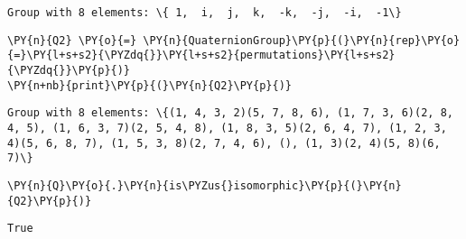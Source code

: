 \begin{itemize}
\begin{itemize}
\begin{tcolorbox}[breakable, size=fbox, boxrule=.5pt, pad at break*=1mm, opacityfill=0]
    \begin{Verbatim}[commandchars=\\\{\}]
Group with 8 elements: \{ 1,  i,  j,  k,  -k,  -j,  -i,  -1\}
    \end{Verbatim}
\end{tcolorbox}


    \begin{tcolorbox}[breakable, size=fbox, boxrule=1pt, pad at break*=1mm,colback=cellbackground, colframe=cellborder]
\begin{Verbatim}[commandchars=\\\{\}]
\PY{n}{Q2} \PY{o}{=} \PY{n}{QuaternionGroup}\PY{p}{(}\PY{n}{rep}\PY{o}{=}\PY{l+s+s2}{\PYZdq{}}\PY{l+s+s2}{permutations}\PY{l+s+s2}{\PYZdq{}}\PY{p}{)}
\PY{n+nb}{print}\PY{p}{(}\PY{n}{Q2}\PY{p}{)}
\end{Verbatim}
\end{tcolorbox}

    \begin{Verbatim}[commandchars=\\\{\}]
Group with 8 elements: \{(1, 4, 3, 2)(5, 7, 8, 6), (1, 7, 3, 6)(2, 8, 4, 5), (1, 6, 3, 7)(2, 5, 4, 8), (1, 8, 3, 5)(2, 6, 4, 7), (1, 2, 3, 4)(5, 6, 8, 7), (1, 5, 3, 8)(2, 7, 4, 6), (), (1, 3)(2, 4)(5, 8)(6, 7)\}
    \end{Verbatim}

    \begin{tcolorbox}[breakable, size=fbox, boxrule=1pt, pad at break*=1mm,colback=cellbackground, colframe=cellborder]
\begin{Verbatim}[commandchars=\\\{\}]
\PY{n}{Q}\PY{o}{.}\PY{n}{is\PYZus{}isomorphic}\PY{p}{(}\PY{n}{Q2}\PY{p}{)}
\end{Verbatim}
\end{tcolorbox}

            \begin{tcolorbox}[breakable, size=fbox, boxrule=.5pt, pad at break*=1mm, opacityfill=0]
\begin{Verbatim}[commandchars=\\\{\}]
True
\end{Verbatim}
\end{tcolorbox}
        


\end{itemize}
\end{itemize}
